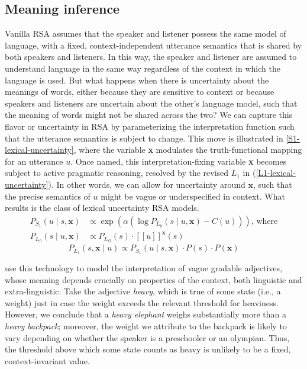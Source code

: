 \documentclass{sp}
\newcommand{\mf}[1]{\textcolor{orange}{[mf: #1]}}
\newcommand{\mht}[1]{\textcolor{purple}{[mht: #1]}}
\newcommand{\sem}[1]{\ensuremath{[\![#1]\!]}}
\begin{document}
\subsection{Meaning inference} \label{meaning-inference}

Vanilla RSA assumes that the speaker and listener possess the same model of language, with a fixed, context-independent utterance semantics that is shared by both speakers and listeners. In this way, the speaker and listener are assumed to understand language in the same way regardless of the context in which the language is used. But what happens when there is uncertainty about the meanings of words, either because they are sensitive to context or because speakers and listeners are uncertain about the other's language model, such that the meaning of words might not be shared across the two? We can capture this flavor or uncertainty in RSA by parameterizing the interpretation function such that the utterance semantics is subject to change. This move is illustrated in \eqref{S1-lexical-uncertainty}, where the variable \textbf{x} modulates the truth-functional mapping for an utterance $u$. Once named, this interpretation-fixing variable \textbf{x} becomes subject to active pragmatic reasoning, resolved by the revised $L_1$ in (\ref{L1-lexical-uncertainty}). In other words, we can allow for uncertainty around $\textbf{x}$, such that the precise semantics of $u$ might be vague or underspecified in context. What results is the class of lexical uncertainty RSA models. %
\begin{align} \label{S1-lexical-uncertainty}
P_{S_1}(u\mid s, \textbf{x}) & \propto \exp (\alpha (\log P_{L_0}(s\mid u, \textbf{x}) - C(u))) \text{, where} \\
  P_{L_0}(s \mid u, \textbf{x}) & \propto P_{L_O}(s)  \cdot \sem{u}^{\textbf{x}}(s) \nonumber
\end{align}
\begin{equation} \label{L1-lexical-uncertainty}
P_{L_1}(s, \textbf{x} \mid u) \propto P_{S_1}(u \mid s, \textbf{x}) \cdot P(s) \cdot P(\textbf{x})
\end{equation}

\cite{lassitergoodman2013} use this technology to model the interpretation of vague gradable adjectives, whose meaning depends crucially on properties of the context, both linguistic and extra-linguistic. Take the adjective \emph{heavy}, which is true of some state (i.e., a weight) just in case the weight exceeds the relevant threshold for heaviness. However, we conclude that a \emph{heavy elephant} weighs substantially more than a \emph{heavy backpack}; moreover, the weight we attribute to the backpack is likely to vary depending on whether the speaker is a preschooler or an olympian. Thus, the threshold above which some state counts as heavy is unlikely to be a fixed, context-invariant value.
\end{document}
